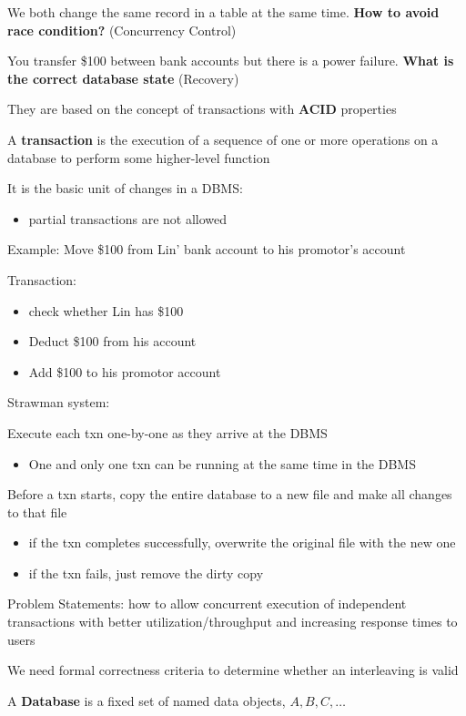 \documentclass[11pt]{article}
\begin{document}
We both change the same record in a table at the same time. \textbf{How to avoid race condition?}
(Concurrency Control)

You transfer \$100 between bank accounts but there is a power failure. \textbf{What is the correct
database state} (Recovery)

They are based on the concept of transactions with \textbf{ACID} properties

A \textbf{transaction} is the execution of a sequence of one or more operations on a database to perform
some higher-level function

It is the basic unit of changes in a DBMS:
\begin{itemize}
\item partial transactions are not allowed
\end{itemize}

Example: Move \$100 from Lin' bank account to his promotor's account

Transaction:
\begin{itemize}
\item check whether Lin has \$100
\item Deduct \$100 from his account
\item Add \$100 to his promotor account
\end{itemize}

Strawman system:

Execute each txn one-by-one as they arrive at the DBMS
\begin{itemize}
\item One and only one txn can be running at the same time in the DBMS
\end{itemize}

Before a txn starts, copy the entire database to a new file and make all changes to that file
\begin{itemize}
\item if the txn completes successfully, overwrite the original file with the new one
\item if the txn fails, just remove the dirty copy
\end{itemize}

Problem Statements: how to allow concurrent execution of independent transactions with better
utilization/throughput and increasing response times to users

We need formal correctness criteria to determine whether an interleaving is valid

A \textbf{Database} is a fixed set of named data objects, \(A,B,C,\dots\)
\end{document}
